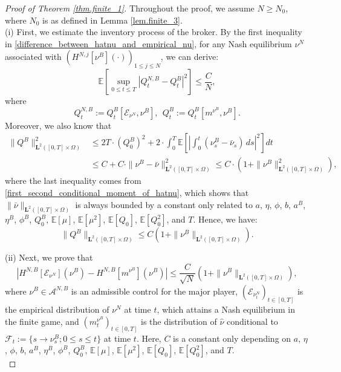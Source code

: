 \documentclass[10pt]{article}
\begin{document}
\begin{proof}[Proof of Theorem \ref{thm.finite_1}]

    Throughout the proof, we assume $N \geq N_0$, where $N_0$ is as defined in Lemma \ref{lem.finite_3}. \\

    (i) First, we estimate the inventory process of the broker. By the first inequality in \eqref{difference_between_hatnu_and_empirical_nu}, for any Nash equilibrium $\nu^N$ associated with $(H^{N,j}[\nu^B](\cdot))_{1 \leq j \leq N}$, we can derive:
    \begin{equation}\label{difference_between_QNB_and_QB}
        \mathbb{E} \left[ \underset{0 \leq t \leq T}{\sup} \left| Q_t^{N,B} - Q^B_t \right|^2 \right] \leq \frac{C}{N},
    \end{equation}
    where
    $$
    Q_t^{N,B} := Q^B_t[\mathcal{E}_{\nu^N}, \nu^B],~~ Q_t^{B} := Q^B_t[m^{\nu^B}, \nu^B].
    $$
    Moreover, we also know that 
    \begin{align*}
        \|Q^B\|^2_{\mathbf{L}^2 ([0,T] \times \Omega)} &\leq 2T \cdot (Q_0^B)^2 + 2 \cdot \int_0^T \mathbb{E} \left[ \left| \int_0^t (\nu_s^B - \bar{\nu}_s) \, ds \right|^2 \right] dt \\
        &\leq C + C \cdot \|\nu^B - \bar{\nu}\|^2_{\mathbf{L}^2 ([0,T] \times \Omega)} \leq C \cdot \left( 1 + \|\nu^B\|^2_{\mathbf{L}^2 ([0,T] \times \Omega)} \right),
    \end{align*}
    where the last inequality comes from \eqref{first_second_conditional_moment_of_hatnu}, which shows that $\|\bar{\nu}\|_{\mathbf{L}^2 ([0,T] \times \Omega)}$ is always bounded by a constant only related to $a$, $\eta$, $\phi$, $b$, $a^B$, $\eta^B$, $\phi^B$, $Q_0^B$, $\mathbb{E}[\mu]$, $\mathbb{E}[\mu^2]$, $\mathbb{E}[Q_0]$, $\mathbb{E}[Q_0^2]$, and $T$. Hence, we have:
    \begin{equation}\label{QB_estimate}
        \|Q^B\|_{\mathbf{L}^2 ([0,T] \times \Omega)} \leq C \left( 1 + \|\nu^B\|_{\mathbf{L}^2 ([0,T] \times \Omega)} \right).
    \end{equation}

    (ii) Next, we prove that 
    \begin{equation}\label{HNB_estimate}
        \left| H^{N,B}\left[\mathcal{E}_{\nu^N}\right]\left(\nu^B\right) - H^{N,B}\left[m^{\nu^B}\right]\left(\nu^B\right) \right| \leq \frac{C}{\sqrt{N}} \left( 1 + \|\nu^B\|_{\mathbf{L}^2 ([0,T] \times \Omega)} \right),
    \end{equation}
    where $\nu^B \in \mathcal{A}^{N,B}$ is an admissible control for the major player, 
    $(\mathcal{E}_{\nu_t^N})_{t \in [0,T]}$ is the empirical distribution of $\nu^N$ at time $t$, which attains a Nash equilibrium in the finite game, 
    and $(m^{\nu^B}_t)_{t \in [0,T]}$ is the distribution of $\hat{\nu}$ conditional to $\mathcal{F}_t := \{ s \to \nu^B_s ; 0 \leq s \leq t \}$ at time $t$.    
    Here, $C$ is a constant only depending on $a$, $\eta$, $\phi$, $b$, $a^B$, $\eta^B$, $\phi^B$, $Q_0^B$, $\mathbb{E}[\mu]$, $\mathbb{E}[\mu^2]$, $\mathbb{E}[Q_0]$, $\mathbb{E}[Q_0^2]$, and $T$. \\


\end{proof}
\end{document}
